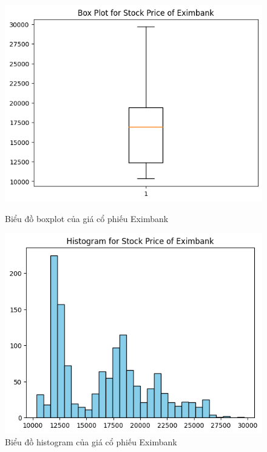 \begin{figure}[H]
    \centering
    \begin{minipage}{0.23\textwidth}
    \centering
    \includegraphics[width=1\textwidth]{resources/chapter-3/newdata/Boxplot_Eximbank.png}
    \caption{Biểu đồ boxplot của giá cổ phiếu Eximbank}
    \label{fig:eximbank_boxplot}
    \end{minipage}
    \hfill
    \begin{minipage}{0.23\textwidth}
    \centering
    \includegraphics[width=1\textwidth]{resources/chapter-3/newdata/Histogram_Eximbank.png}
    \caption{Biểu đồ histogram của giá cổ phiếu Eximbank}
    \label{fig:eximbank_histogram}
    \end{minipage}
\end{figure}


